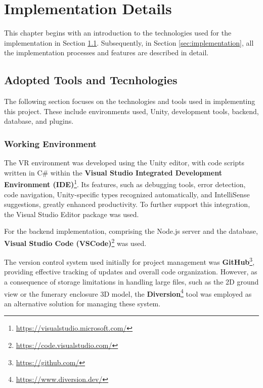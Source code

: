 
%
\chapter{Implementation Details}
\label{cha:system_implementation}
This chapter begins with an introduction to the technologies used for the implementation in Section \ref{sec:tools}.
Subsequently, in Section \ref{sec:implementation}, all the implementation processes and features are described in detail.

\section{Adopted Tools and Tecnhologies}
\label{sec:tools}
The following section focuses on the technologies and tools used in implementing this project. 
These include environments used, Unity, development tools, backend, database, and plugins.

\subsection{Working Environment}

The  \gls{VR} environment was developed using the Unity editor, with code scripts written in C\# within the \textbf{Visual Studio Integrated Development Environment (IDE)}\footnote{\url{https://visualstudio.microsoft.com/}}.
Its features, such as debugging tools, error detection, code navigation, Unity-specific types recognized automatically, and IntelliSense suggestions, greatly enhanced productivity. 
To further support this integration, the Visual Studio Editor package was used. 

For the backend implementation, comprising the Node.js server and the database, \textbf{Visual Studio Code (VSCode)}\footnote{\url{https://code.visualstudio.com/}} was used. 

The version control system used initially for project management was \textbf{GitHub}\footnote{\url{https://github.com/}}, providing effective tracking of updates and overall code organization.
However, as a consequence of storage limitations in handling large files, such as the \gls{2D} ground view or the funerary enclosure \gls{3D} model, the \textbf{Diversion}\footnote{\url{https://www.diversion.dev/}} tool was employed as an alternative solution for managing these system.

